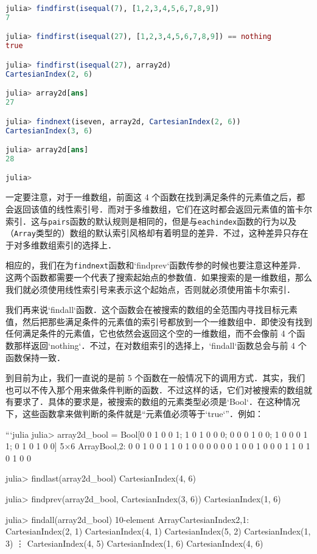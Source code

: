 \begin{lstlisting}[language=julia]
julia> findfirst(isequal(7), [1,2,3,4,5,6,7,8,9])
7

julia> findfirst(isequal(27), [1,2,3,4,5,6,7,8,9]) == nothing
true

julia> findfirst(isequal(27), array2d)
CartesianIndex(2, 6)

julia> array2d[ans]
27

julia> findnext(iseven, array2d, CartesianIndex(2, 6))
CartesianIndex(3, 6)

julia> array2d[ans]
28

julia> 
\end{lstlisting}

一定要注意，对于一维数组，前面这 4 个函数在找到满足条件的元素值之后，都会返回该值的线性索引号．而对于多维数组，它们在这时都会返回元素值的笛卡尔索引．这与\verb|pairs|函数的默认规则是相同的，但是与\verb|eachindex|函数的行为以及（\verb|Array|类型的）数组的默认索引风格却有着明显的差异．不过，这种差异只存在于对多维数组索引的选择上．

相应的，我们在为\verb|findnext|函数和`findprev`函数传参的时候也要注意这种差异．这两个函数都需要一个代表了搜索起始点的参数值．如果搜索的是一维数组，那么我们就必须使用线性索引号来表示这个起始点，否则就必须使用笛卡尔索引．

我们再来说`findall`函数．这个函数会在被搜索的数组的全范围内寻找目标元素值，然后把那些满足条件的元素值的索引号都放到一个一维数组中．即使没有找到任何满足条件的元素值，它也依然会返回这个空的一维数组，而不会像前 4 个函数那样返回`nothing`．不过，在对数组索引的选择上，`findall`函数总会与前 4 个函数保持一致．

到目前为止，我们一直说的是前 5 个函数在一般情况下的调用方式．其实，我们也可以不传入那个用来做条件判断的函数．不过这样的话，它们对被搜索的数组就有要求了．具体的要求是，被搜索的数组的元素类型必须是`Bool`．在这种情况下，这些函数拿来做判断的条件就是“元素值必须等于`true`”．例如：

```julia
julia> array2d_bool = Bool[0 0 1 0 0 1; 1 0 1 0 0 0; 0 0 0 1 0 0; 1 0 0 0 1 1; 0 1 0 1 0 0]
5×6 Array{Bool,2}:
 0  0  1  0  0  1
 1  0  1  0  0  0
 0  0  0  1  0  0
 1  0  0  0  1  1
 0  1  0  1  0  0

julia> findlast(array2d_bool)
CartesianIndex(4, 6)

julia> findprev(array2d_bool, CartesianIndex(3, 6))
CartesianIndex(1, 6)

julia> findall(array2d_bool)
10-element Array{CartesianIndex{2},1}:
 CartesianIndex(2, 1)
 CartesianIndex(4, 1)
 CartesianIndex(5, 2)
 CartesianIndex(1, 3)
 ⋮                   
 CartesianIndex(4, 5)
 CartesianIndex(1, 6)
 CartesianIndex(4, 6)

